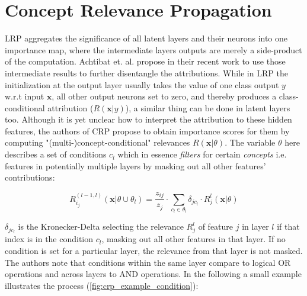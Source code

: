 \section{Concept Relevance Propagation}

LRP aggregates the significance of all latent layers and their neurons into one importance map, where the intermediate layers outputs are merely a side-product of the computation.
Achtibat et. al. propose in their recent work \cite{Achtibat2022} to use those intermediate results to further disentangle the attributions. While in LRP the initialization at the output layer usually takes the value of one class output $y$ w.r.t input $\mathbf{x}$, all other output neurons set to zero, and thereby produces a class-conditional attribution ($R(\mathbf{x}|y)$), a similar thing can be done in latent layers too. Although it is yet unclear how to interpret the attribution to these hidden features, the authors of CRP propose to obtain importance scores for them by computing "(multi-)concept-conditional" relevances $R(\mathbf{x}|\theta)$. The variable $\theta$ here describes a set of conditions $c_l$ which in essence \textit{filters} for certain \textit{concepts} i.e. features in potentially multiple layers by masking out all other features' contributions:

\begin{equation}
    R^{(l-1, l)}_{i_j} (\mathbf{x} | \theta \cup \theta_l) = \frac{z_{ij}}{z_j} \cdot \sum_{c_l \in \theta_l} \delta_{jc_l} \cdot R^{l}_j (\mathbf{x} | \theta )
\end{equation}

$\delta_{jc_l}$ is the Kronecker-Delta selecting the relevance $R^l_j$ of feature $j$ in layer $l$ if that index is in the condition $c_l$, masking out all other features in that layer. If no condition is set for a particular layer, the relevance from that layer is not masked. The authors note that conditions within the same layer compare to logical OR operations and across layers to AND operations. In the following a small example illustrates the process (\autoref{fig:crp_example_condition}):


